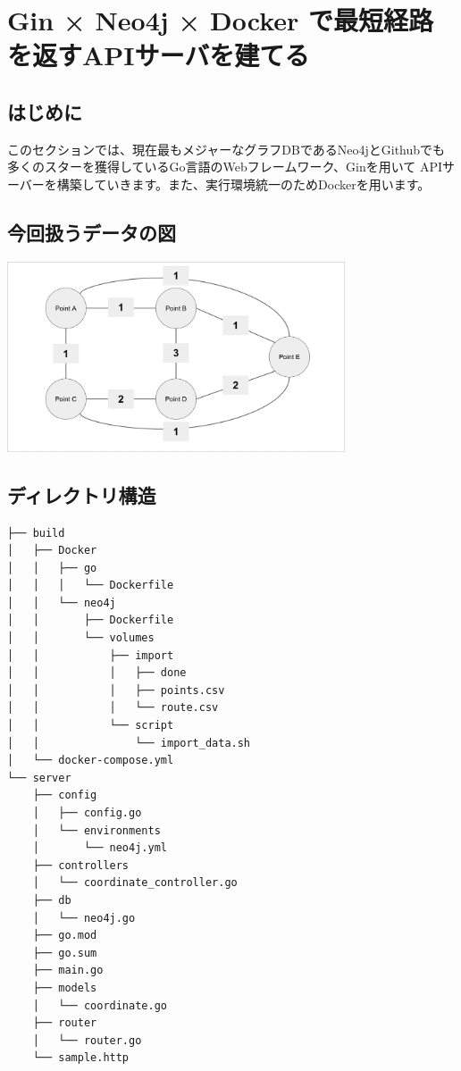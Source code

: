
\section{Gin × Neo4j × Docker で最短経路を返すAPIサーバを建てる}
\subsection{はじめに}
このセクションでは、現在最もメジャーなグラフDBであるNeo4jとGithubでも多くのスターを獲得しているGo言語のWebフレームワーク、Ginを用いて
APIサーバーを構築していきます。また、実行環境統一のためDockerを用います。

\subsection{今回扱うデータの図}
\includegraphics[width=10cm]{./image/03-Tech/chap3/sample_node.png}

\subsection{ディレクトリ構造}
\begin{tcolorbox}[title=ディレクトリ構造]
    \begin{verbatim}
├── build
│   ├── Docker
│   │   ├── go
│   │   │   └── Dockerfile
│   │   └── neo4j
│   │       ├── Dockerfile
│   │       └── volumes
│   │           ├── import
│   │           │   ├── done
│   │           │   ├── points.csv
│   │           │   └── route.csv
│   │           └── script
│   │               └── import_data.sh
│   └── docker-compose.yml
└── server
    ├── config
    │   ├── config.go
    │   └── environments
    │       └── neo4j.yml
    ├── controllers
    │   └── coordinate_controller.go
    ├── db
    │   └── neo4j.go
    ├── go.mod
    ├── go.sum
    ├── main.go
    ├── models
    │   └── coordinate.go
    ├── router
    │   └── router.go
    └── sample.http
\end{verbatim}
\end{tcolorbox}

